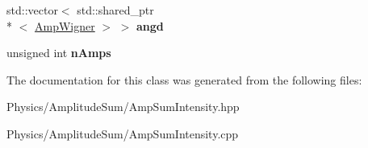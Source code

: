 \begin{DoxyCompactItemize}
\item 
\hypertarget{class_amp_sum_intensity_a057994051c08ae3bd7f8aa97213f3bd0}{std\-::vector$<$ std\-::shared\-\_\-ptr\\*
$<$ \hyperlink{class_amp_wigner}{Amp\-Wigner} $>$ $>$ {\bfseries angd}}\label{class_amp_sum_intensity_a057994051c08ae3bd7f8aa97213f3bd0}

\item 
\hypertarget{class_amp_sum_intensity_a08af6659c398af25cb3b070a4f19e961}{unsigned int {\bfseries n\-Amps}}\label{class_amp_sum_intensity_a08af6659c398af25cb3b070a4f19e961}

\end{DoxyCompactItemize}


The documentation for this class was generated from the following files\-:\begin{DoxyCompactItemize}
\item 
Physics/\-Amplitude\-Sum/Amp\-Sum\-Intensity.\-hpp\item 
Physics/\-Amplitude\-Sum/Amp\-Sum\-Intensity.\-cpp\end{DoxyCompactItemize}
